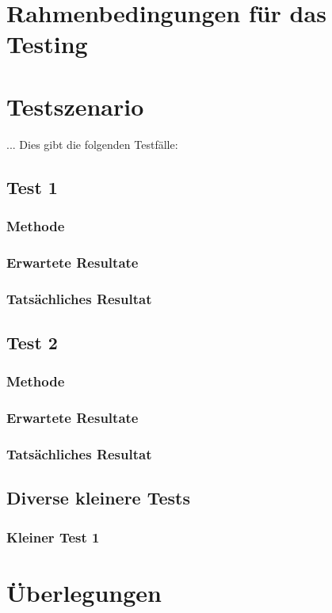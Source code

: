 \section{Rahmenbedingungen für das Testing}

\section{Testszenario}
...
Dies gibt die folgenden Testfälle:
\subsection{Test 1}
\subsubsection{Methode}

\subsubsection{Erwartete Resultate}

\subsubsection{Tatsächliches Resultat}

\subsection{Test 2}
\subsubsection{Methode}

\subsubsection{Erwartete Resultate}

\subsubsection{Tatsächliches Resultat}

\subsection{Diverse kleinere Tests}
\subsubsection{Kleiner Test 1}
\section{Überlegungen}
